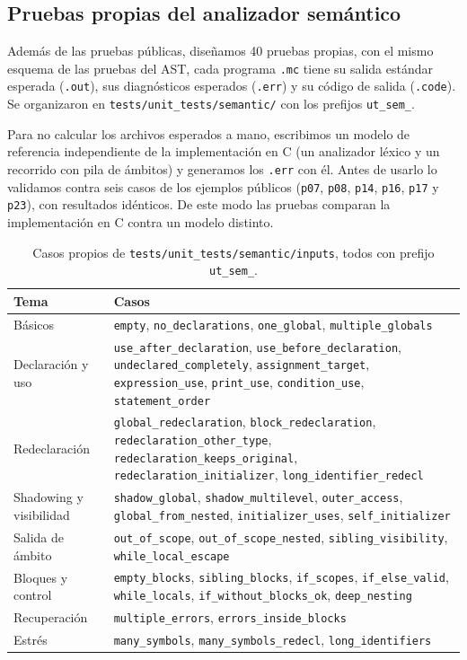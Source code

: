 \documentclass[12pt,letterpaper]{article}
\begin{document}
\subsection*{Pruebas propias del analizador semántico}

Además de las pruebas públicas, diseñamos 40 pruebas propias, con el mismo esquema de las pruebas del AST,
cada programa \texttt{.mc} tiene su salida estándar esperada (\texttt{.out}), sus diagnósticos esperados
(\texttt{.err}) y su código de salida (\texttt{.code}). Se organizaron en \texttt{tests/unit\_tests/semantic/}
con los prefijos \texttt{ut\_sem\_}.

Para no calcular los archivos esperados a mano, escribimos un modelo de referencia independiente de la
implementación en C (un analizador léxico y un recorrido con pila de ámbitos) y generamos los \texttt{.err}
con él. Antes de usarlo lo validamos contra seis casos de los ejemplos públicos
(\texttt{p07}, \texttt{p08}, \texttt{p14}, \texttt{p16}, \texttt{p17} y \texttt{p23}), con resultados idénticos.
De este modo las pruebas comparan la implementación en C contra un modelo distinto.

\begin{table}[H]
\centering
\small
\begin{tabular}{|p{3.4cm}|p{12cm}|}
\hline
\textbf{Tema} & \textbf{Casos} \\ \hline
Básicos & \texttt{empty}, \texttt{no\_declarations}, \texttt{one\_global}, \texttt{multiple\_globals} \\ \hline
Declaración y uso & \texttt{use\_after\_declaration}, \texttt{use\_before\_declaration},
  \texttt{undeclared\_completely}, \texttt{assignment\_target}, \texttt{expression\_use},
  \texttt{print\_use}, \texttt{condition\_use}, \texttt{statement\_order} \\ \hline
Redeclaración & \texttt{global\_redeclaration}, \texttt{block\_redeclaration},
  \texttt{redeclaration\_other\_type}, \texttt{redeclaration\_keeps\_original},
  \texttt{redeclaration\_initializer}, \texttt{long\_identifier\_redecl} \\ \hline
Shadowing y visibilidad & \texttt{shadow\_global}, \texttt{shadow\_multilevel}, \texttt{outer\_access},
  \texttt{global\_from\_nested}, \texttt{initializer\_uses}, \texttt{self\_initializer} \\ \hline
Salida de ámbito & \texttt{out\_of\_scope}, \texttt{out\_of\_scope\_nested},
  \texttt{sibling\_visibility}, \texttt{while\_local\_escape} \\ \hline
Bloques y control & \texttt{empty\_blocks}, \texttt{sibling\_blocks}, \texttt{if\_scopes},
  \texttt{if\_else\_valid}, \texttt{while\_locals}, \texttt{if\_without\_blocks\_ok},
  \texttt{deep\_nesting} \\ \hline
Recuperación & \texttt{multiple\_errors}, \texttt{errors\_inside\_blocks} \\ \hline
Estrés & \texttt{many\_symbols}, \texttt{many\_symbols\_redecl}, \texttt{long\_identifiers} \\ \hline
\end{tabular}
\caption{Casos propios de \texttt{tests/unit\_tests/semantic/inputs}, todos con prefijo \texttt{ut\_sem\_}.}
\end{table}
\end{document}

